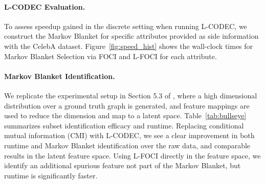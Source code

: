 \paragraph{L-CODEC Evaluation.}
To assess speedup gained in the discrete setting when running L-CODEC,
we construct the Markov Blanket for specific attributes provided as side information with the CelebA dataset. Figure~\ref{fig:speed_hist} shows the wall-clock times for Markov Blanket Selection via FOCI and L-FOCI for each attribute.

\paragraph{Markov Blanket Identification.} We replicate the experimental setup in Section 5.3 of \cite{bullseye}, where a high dimensional distribution over a ground truth graph is generated, and feature mappings are used to reduce the dimension and map to a latent space. Table~\ref{tab:bullseye} summarizes subset identification efficacy and runtime. Replacing conditional mutual information (CMI) with L-CODEC, we see a clear improvement in both runtime and Markov Blanket identification over the raw data, and comparable results in the latent feature space. Using L-FOCI directly in the feature space, we identify an additional spurious feature not part of the Markov Blanket, but runtime is significantly faster.
